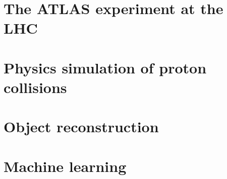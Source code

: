 

\chapter{The ATLAS experiment at the LHC}
\label{chapter:ATLASLHC}


\chapter{Physics simulation of proton collisions}
\label{chapter:EventSim}


\chapter{Object reconstruction}
\label{chapter:EventReco}



\chapter{Machine learning}
\label{chapter:ML}
